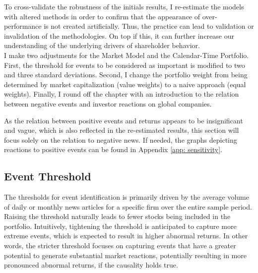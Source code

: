 
To cross-validate the robustness of the initials results, I re-estimate the models with altered methods in order to confirm that the appearance of over-performance is not created artificially. Thus, the practice can lead to validation or invalidation of the methodologies. On top if this, it can further increase our understanding of the underlying drivers of shareholder behavior. \\
I make two adjustments for the Market Model and the Calendar-Time Portfolio. First, the threshold for events to be considered as important is modified to two and three standard deviations. Second, I change the portfolio weight from being determined by market capitalization (value weights) to a naive approach (equal weights). Finally, I round off the chapter with an introduction to the relation between negative events and investor reactions on global companies. 

As the relation between positive events and returns appears to be insignificant and vague, which is also reflected in the re-estimated results, this section will focus solely on the relation to negative news. If needed, the graphs depicting reactions to positive events can be found in Appendix \ref{app: sensitivity}.

\subsection{Event Threshold} \label{sec: sens_st_sd}

The thresholds for event identification is primarily driven by the average volume of daily or monthly news articles for a specific firm over the entire sample period. Raising the threshold naturally leads to fewer stocks being included in the portfolio. Intuitively, tightening the threshold is anticipated to capture more extreme events, which is expected to result in higher abnormal returns. In other words, the stricter threshold focuses on capturing events that have a greater potential to generate substantial market reactions, potentially resulting in more pronounced abnormal returns, if the causality holds true. 

